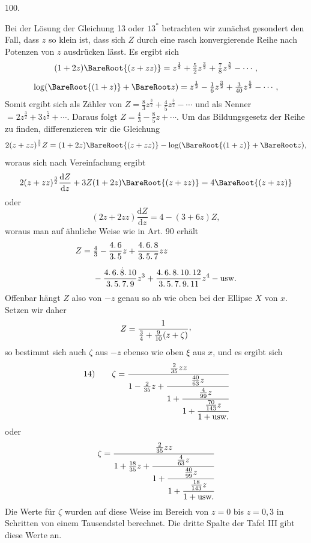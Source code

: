 \par{}\medskip
{}
\begin{center}100.\end{center}
Bei der Lösung der Gleichung 13 oder $13^*$ betrachten wir zunächst gesondert den Fall, dass $z$ so klein ist, dass sich $Z$ durch eine rasch konvergierende Reihe nach Potenzen von $z$ ausdrücken lässt. Es ergibt sich
\[
\begin{gathered}
(1+2z)\BareRoot{(z+zz)}=z^{\frac12}+\tfrac52z^{\frac32}+\tfrac78z^{\frac52}-\cdots,\\[.5em]
\log(\BareRoot{(1+z)}+\BareRoot z)=z^{\frac12}-\tfrac16z^{\frac32}+\tfrac3{40}z^{\frac52}-\cdots,
\end{gathered}
\]
\noindent Somit ergibt sich als Zähler von $Z=\tfrac83z^{\frac32}+\tfrac45z^{\frac52}-\cdots$ und als Nenner $=2z^{\frac32}+3z^{\frac52}+\cdots$. Daraus folgt $Z=\tfrac43-\tfrac85z+\cdots$. Um das Bildungsgesetz der Reihe zu finden, differenzieren wir die Gleichung
\[
2(z+zz)^{\frac32}Z=(1+2z)\BareRoot{(z+zz)}-\log(\BareRoot{(1+z)}+\BareRoot z),
\]
\noindent woraus sich nach Vereinfachung ergibt
\[
2(z+zz)^{\frac32}\frac{\mathrm dZ}{\mathrm dz}+3Z(1+2z)\BareRoot{(z+zz)}=4\BareRoot{(z+zz)}
\]
\noindent oder
\[
(2z+2zz)\frac{\mathrm dZ}{\mathrm dz}=4-(3+6z)Z,
\]
\noindent woraus man auf ähnliche Weise wie in Art. 90 erhält
\[
\begin{aligned}
Z={}&\tfrac43-\frac{4\mathpunct{.}6}{3\mathpunct{.}5}z+\frac{4\mathpunct{.}6\mathpunct{.}8}{3\mathpunct{.}5\mathpunct{.}7}zz\\[.5em]
&-\frac{4\mathpunct{.}6\mathpunct{.}\overset{\mkern2mu .}{8}\mathpunct{.}10}{3\mathpunct{.}5\mathpunct{.}7\mathpunct{.}9}z^3+\frac{4\mathpunct{.}6\mathpunct{.}8\mathpunct{.}10\mathpunct{.}12}{3\mathpunct{.}5\mathpunct{.}7\mathpunct{.}9\mathpunct{.}11}z^4-\text{usw.}
\end{aligned}
\]
\noindent Offenbar hängt $Z$ also von $-z$ genau so ab wie oben bei der Ellipse $X$ von $x$. Setzen wir daher
\[
Z=\frac1{\tfrac34+\tfrac9{10}(z+\zeta)}\mathpunct{\raisebox{.45ex}{,}}
\]
\noindent so bestimmt sich auch $\zeta$ aus $-z$ ebenso wie oben $\xi$ aus $x$, und es ergibt sich
\[
\mathrm{14)}\qquad\zeta=\cfrac{\tfrac2{35}zz}{1-\tfrac2{35}z+\cfrac{\tfrac{40}{63}z}{1+\cfrac{\tfrac4{99}z}{1+\cfrac{\tfrac{70}{143}z}{1+\text{usw.}}}}}
\]
\noindent oder
\[
\zeta=\cfrac{\tfrac2{35}zz}{1+\tfrac{18}{35}z+\cfrac{\tfrac4{63}z}{1+\cfrac{\tfrac{40}{99}z}{1+\cfrac{\tfrac{18}{143}z}{1+\text{usw.}}}}}
\]
\noindent{}Die Werte für $\zeta$ wurden auf diese Weise im Bereich von $z=0$ bis $z=0{,}3$ in Schritten von einem Tausendstel berechnet. Die dritte Spalte der Tafel III gibt diese Werte an.
